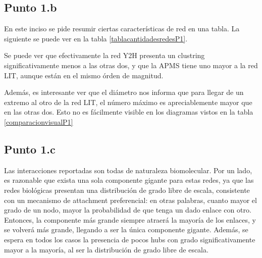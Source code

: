 \documentclass{article}
\begin{document}
\subsection{Punto 1.b}
En este inciso se pide resumir ciertas características de red en una tabla. La siguiente se puede ver en la tabla \ref{tablacantidadesredesP1}.

\begin{table}[ht]
\caption{Cantidades de red asociadas a las redes correspondientes.}
\centering
{}
\label{tablacantidadesredesP1}
\end{table}

Se puede ver que efectivamente la red Y2H presenta un clustring significativamente menos a las otras dos, y que la APMS tiene uno mayor a la red LIT, aunque están en el mismo órden de magnitud.

Además, es interesante ver que el diámetro nos informa que para llegar de un extremo al otro de la red LIT, el número máximo es apreciablemente mayor que en las otras dos. Esto no es fácilmente visible en los diagramas vistos en la tabla \ref{comparacionvisualP1}

\subsection{Punto 1.c}

Las interacciones reportadas son todas de naturaleza biomolecular. Por un lado, es razonable que exista una sola componente gigante para estas redes, ya que las redes biológicas presentan una distribución de grado libre de escala, consistente con un mecanismo de attachment preferencial: en otras palabras, cuanto mayor el grado de un nodo, mayor la probabilidad de que tenga un dado enlace con otro. Entonces, la componente más grande siempre atraerá la mayoría de los enlaces, y se volverá más grande, llegando a ser la única componente gigante. Además, se espera en todos los casos la presencia de pocos hubs con grado significativamente mayor a la mayoría, al ser la distribución de grado libre de escala.
\end{document}
